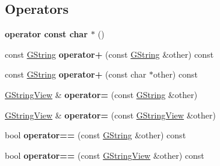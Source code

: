 \subsection*{Operators}
\begin{DoxyCompactItemize}
\item 
\mbox{\label{classrev_1_1_g_string_view_aa3aef2482fcd142f59ee2429482b4df0}} 
{\bfseries operator const char $\ast$} ()
\item 
\mbox{\label{classrev_1_1_g_string_view_a1f6bd61c8007c8ba23d9cbdeafe44af4}} 
const \mbox{\hyperlink{classrev_1_1_g_string}{G\+String}} {\bfseries operator+} (const \mbox{\hyperlink{classrev_1_1_g_string}{G\+String}} \&other) const
\item 
\mbox{\label{classrev_1_1_g_string_view_afeaa21535fb02f0e2b155f2b58bff288}} 
const \mbox{\hyperlink{classrev_1_1_g_string}{G\+String}} {\bfseries operator+} (const char $\ast$other) const
\item 
\mbox{\label{classrev_1_1_g_string_view_a7d4b2288b8e5e9831929b5f70e91ea37}} 
\mbox{\hyperlink{classrev_1_1_g_string_view}{G\+String\+View}} \& {\bfseries operator=} (const \mbox{\hyperlink{classrev_1_1_g_string}{G\+String}} \&other)
\item 
\mbox{\label{classrev_1_1_g_string_view_a59ed077d49830b6a219513a12d630aac}} 
\mbox{\hyperlink{classrev_1_1_g_string_view}{G\+String\+View}} \& {\bfseries operator=} (const \mbox{\hyperlink{classrev_1_1_g_string_view}{G\+String\+View}} \&other)
\item 
\mbox{\label{classrev_1_1_g_string_view_afa3a795238140b316f6bd7dd7cb4bb8a}} 
bool {\bfseries operator==} (const \mbox{\hyperlink{classrev_1_1_g_string}{G\+String}} \&other) const
\item 
\mbox{\label{classrev_1_1_g_string_view_a2389e64cce90fa7d66325a209f6552da}} 
bool {\bfseries operator==} (const \mbox{\hyperlink{classrev_1_1_g_string_view}{G\+String\+View}} \&other) const
\item 
\mbox{\label{classrev_1_1_g_string_view_a829062a1c9d18e40fa85db4574a1eba9}} 

\end{DoxyCompactItemize}
